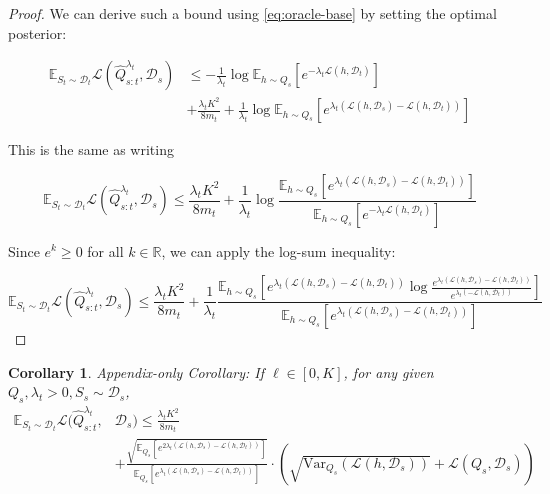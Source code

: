 \documentclass{article}
\theoremstyle{plain}
\newtheorem{corollary}[theorem]{Corollary}
\theoremstyle{definition}
\theoremstyle{remark}
\begin{document}
\begin{proof}
We can derive such a bound using \eqref{eq:oracle-base} by setting the optimal posterior:

\begin{equation*} 
\begin{split}
\mathbb{E}_{S_t\sim \mathcal{D}_t}\mathcal{L}( \hat{Q}^{\lambda_t}_{s:t},\mathcal{D}_s)&\leq -\frac{1}{\lambda_t}\log \mathbb{E}_{h\sim Q_s}\left [e^{-\lambda_t\mathcal{L}(h,\mathcal{D}_t)}\right ]\\&+\frac{\lambda_t K^2}{8m_t}+\frac{1}{\lambda_t}\log\mathbb{E}_{h\sim Q_s}\left [e^{\lambda_t(\mathcal{L}(h,\mathcal{D}_s)-\mathcal{L}(h,\mathcal{D}_t))} \right ]
\end{split}
\end{equation*}

This is the same as writing

$$
\mathbb{E}_{S_t\sim \mathcal{D}_t}\mathcal{L}( \hat{Q}^{\lambda_t}_{s:t},\mathcal{D}_s)\leq \frac{\lambda_t K^2}{8m_t}+\frac{1}{\lambda_t}\log\frac{\mathbb{E}_{h\sim Q_s}\left [e^{\lambda_t(\mathcal{L}(h,\mathcal{D}_s)-\mathcal{L}(h,\mathcal{D}_t))} \right ]}{\mathbb{E}_{h\sim Q_s}\left [e^{-\lambda_t\mathcal{L}(h,\mathcal{D}_t)}\right ]}
$$

Since $e^k\geq 0$ for all $k\in \mathbb{R}$, we can apply the log-sum inequality:

$$
\mathbb{E}_{S_t\sim \mathcal{D}_t}\mathcal{L}( \hat{Q}^{\lambda_t}_{s:t},\mathcal{D}_s)\leq \frac{\lambda_t K^2}{8m_t}+\frac{1}{\lambda_t}\frac{\mathbb{E}_{h\sim Q_s}\left [e^{\lambda_t(\mathcal{L}(h,\mathcal{D}_s)-\mathcal{L}(h,\mathcal{D}_t))}\log\frac{e^{\lambda_t(\mathcal{L}(h,\mathcal{D}_s)-\mathcal{L}(h,\mathcal{D}_t))}}{e^{\lambda_t(-\mathcal{L}(h,\mathcal{D}_t))}} \right ]}{\mathbb{E}_{h\sim Q_s}\left [e^{\lambda_t(\mathcal{L}(h,\mathcal{D}_s)-\mathcal{L}(h,\mathcal{D}_t))}\right ]}
$$
\end{proof}


\begin{corollary} %
\label{corollary:appendix}
Appendix-only Corollary:
If $\ell\in[0,K]$, for any given $Q_s, \lambda_t>0, S_s\sim \mathcal{D}_s$,  
%
\begin{equation} \label{eq:oracle-final}
\begin{split}
\mathbb{E}_{S_t\sim \mathcal{D}_t}\mathcal{L}( \hat{Q}^{\lambda_t}_{s:t},&\mathcal{D}_s)\leq \frac{\lambda_t K^2}{8m_t}\\&+\frac{\sqrt{\mathbb{E}_{Q_s}\left [e^{2\lambda_t(\mathcal{L}(h,\mathcal{D}_s)-\mathcal{L}(h,\mathcal{D}_t))}\right ]}}{\mathbb{E}_{Q_s}\left [e^{\lambda_t(\mathcal{L}(h,\mathcal{D}_s)-\mathcal{L}(h,\mathcal{D}_t))}\right ]}\cdot \left (\sqrt{\mathrm{Var}_{Q_s}(\mathcal{L}(h,\mathcal{D}_s))}+\mathcal{L}(Q_s,\mathcal{D}_s)\right )
\end{split}
\end{equation}
\end{corollary}
\end{document}
